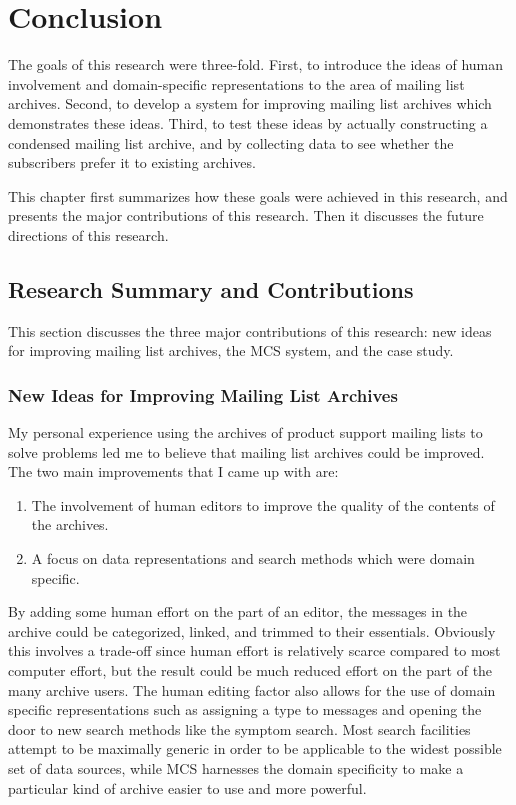 \chapter{Conclusion}
\label{cha:conclusion}
The goals of this research were three-fold. First, to introduce the ideas of
human involvement and domain-specific representations to the area of mailing
list archives. Second, to develop a system for improving mailing list archives
which demonstrates these ideas. Third, to test these ideas by actually
constructing a condensed mailing list archive, and by collecting data to see
whether the subscribers prefer it to existing archives.

This chapter first summarizes how these goals were achieved in this research,
and presents the major contributions of this research. Then it discusses the
future directions of this research.

\section{Research Summary and Contributions}
\label{sec:research-summary}
This section discusses the three major contributions of this research: new
ideas for improving mailing list archives, the MCS system, and the case study.

\subsection{New Ideas for Improving Mailing List Archives}
My personal experience using the archives of product support mailing lists to
solve problems led me to believe that mailing list archives could be improved.
The two main improvements that I came up with are:

\begin{enumerate}
\item The involvement of human editors to improve the quality of the contents
  of the archives.
\item A focus on data representations and search methods which were domain
  specific.
\end{enumerate}

By adding some human effort on the part of an editor, the messages in the
archive could be categorized, linked, and trimmed to their essentials.
Obviously this involves a trade-off since human effort is relatively scarce
compared to most computer effort, but the result could be much reduced effort
on the part of the many archive users. The human editing factor also allows for
the use of domain specific representations such as assigning a type to messages
and opening the door to new search methods like the symptom search. Most search
facilities attempt to be maximally generic in order to be applicable to the
widest possible set of data sources, while MCS harnesses the domain specificity
to make a particular kind of archive easier to use and more powerful.

